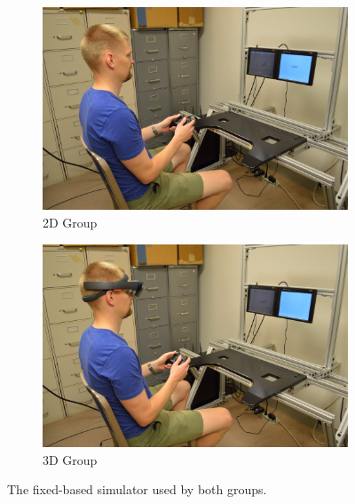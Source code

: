 \begin{figure}[t!]
    \begin{center}
        \begin{subfigure}{0.49\textwidth}
            \includegraphics[width=\linewidth]{figures/DSC_0801.JPG}
            \caption{2D Group}
        \end{subfigure}\hfill
        \begin{subfigure}{0.49\textwidth}
            \includegraphics[width=\linewidth]{figures/DSC_0803.JPG}
            \caption{3D Group}
        \end{subfigure}
        \caption{The fixed-based simulator used by both groups.}%
        \label{fig:simulator}%
    \end{center}
\end{figure}

